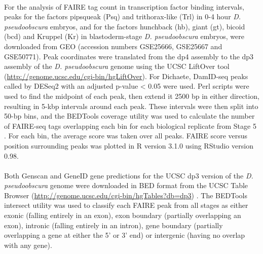\paragraph{}
For the analysis of FAIRE tag count in transcription factor binding intervals, peaks for the factors pipsqueak (Psq) and trithorax-like (Trl) in 0-4 hour \emph{D. pseudoobscura} embryos, and for the factors hunchback (hb), giant (gt), bicoid (bcd) and Kruppel (Kr) in blastoderm-stage \emph{D. pseudoobscura} embryos, were downloaded from GEO (accession numbers GSE25666, GSE25667 and GSE50771). Peak coordinates were translated from the dp4 assembly to the dp3 assembly of the \emph{D. pseudoobscura} genome using the UCSC LiftOver tool (\url{http://genome.ucsc.edu/cgi-bin/hgLiftOver}). For Dichaete, DamID-seq peaks called by DESeq2 with an adjusted p-value < 0.05 were used. Perl scripts were used to find the midpoint of each peak, then extend it 2500 bp in either direction, resulting in 5-kbp intervals around each peak. These intervals were then split into 50-bp bins, and the BEDTools coverage utility was used to calculate the number of FAIRE-seq tags overlapping each bin for each biological replicate from Stage 5 \citep{quinlan_bedtools:_2010}. For each bin, the average score was taken over all peaks. FAIRE score versus position surrounding peaks was plotted in R version 3.1.0 using RStudio version 0.98.
\paragraph{}
Both Genscan and GeneID gene predictions for the UCSC dp3 version of the \emph{D. pseudoobscura} genome were downloaded in BED format from the UCSC Table Browser (\url{http://genome.ucsc.edu/cgi-bin/hgTables?db=dp3}) \citep{burge_prediction_1997,karolchik_ucsc_2004, karolchik_ucsc_2014,parra_geneid_2000}. The BEDTools intersect utility \citep{quinlan_bedtools:_2010} was used to classify each FAIRE peak from all stages as either exonic (falling entirely in an exon), exon boundary (partially overlapping an exon), intronic (falling entirely in an intron), gene boundary (partially overlapping a gene at either the 5’ or 3’ end) or intergenic (having no overlap with any gene).

